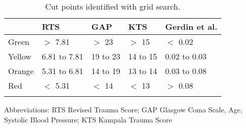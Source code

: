 \begin{table}[!ht]
\centering
\caption{Cut points identified with grid search.} 
\label{table:cut_points}
\begin{adjustbox}{max width = \linewidth} 
\begin{threeparttable} 
\begin{tabular} 
{lllll}
  \toprule
 & RTS & GAP & KTS & Gerdin et al. \\ 
  \midrule
Green & $>$ 7.81 & $>$ 23 & $>$ 15 & $<$ 0.02 \\ 
  Yellow & 6.81 to 7.81 & 19 to 23 & 14 to 15 & 0.02 to 0.03 \\ 
  Orange & 5.31 to 6.81 & 14 to 19 & 13 to 14 & 0.03 to 0.08 \\ 
  Red & $<$ 5.31 & $<$ 14 & $<$ 13 & $>$ 0.08 \\ 
   \bottomrule
\addlinespace 
\end{tabular} 
\begin{tablenotes} \footnotesize 
\item Abbreviations: RTS Revised Trauma Score; GAP Glasgow Coma Scale, Age, Systolic Blood Pressure; KTS Kampala Trauma Score
\end{tablenotes} 
\end{threeparttable} 
\end{adjustbox}
\end{table}

